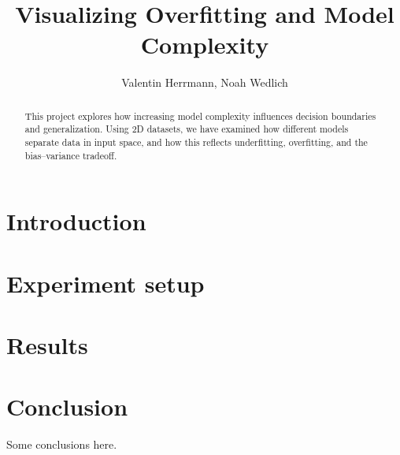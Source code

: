 \documentclass[hidelinks,onefignum,onetabnum]{siamart250211}
\title{Visualizing Overfitting and Model Complexity}
\author{Valentin Herrmann, Noah Wedlich}
\begin{document}
\maketitle

\begin{abstract}
This project explores how increasing model complexity influences decision boundaries and generalization. Using 2D datasets, we have examined how different models separate data in input space, and how this reflects underfitting, overfitting, and the bias–variance tradeoff.
\end{abstract}



\section{Introduction}

\section{Experiment setup}
\label{sec:setup}

\section{Results}
\label{sec:results}

\section{Conclusion}
\label{sec:conclusion}

Some conclusions here.
\end{document}

